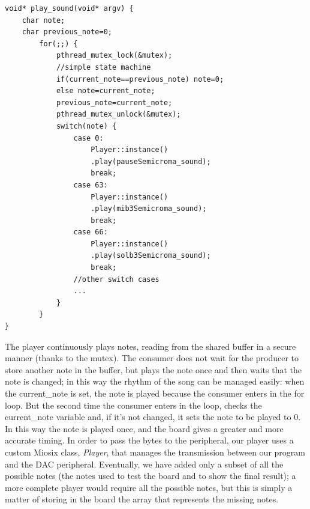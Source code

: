 \documentclass[12pt]{article}
\begin{document}
\begin{lstlisting}
void* play_sound(void* argv) {
	char note;
	char previous_note=0;
		for(;;) {
			pthread_mutex_lock(&mutex);
			//simple state machine
			if(current_note==previous_note) note=0;
			else note=current_note;
			previous_note=current_note;
			pthread_mutex_unlock(&mutex);
			switch(note) {
				case 0:
					Player::instance()
					.play(pauseSemicroma_sound);
					break;
				case 63:
					Player::instance()
					.play(mib3Semicroma_sound);
					break;
				case 66:
					Player::instance()
					.play(solb3Semicroma_sound);
					break;
				//other switch cases
				...
			}
		}
}
\end{lstlisting}
The player continuously plays notes, reading from the shared buffer in a secure manner (thanks to the mutex). The consumer does not wait for the producer to store another note in the buffer, but plays the note once and then waits that the note is changed; in this way the rhythm of the song can be managed easily: when the current\_note is set, the note is played because the consumer enters in the for loop. But the second time the consumer enters in the loop, checks the current\_note variable and, if it's not changed, it sets the note to be played to 0. In this way the note is played once, and the board gives a greater and more accurate timing.\newline
In order to pass the bytes to the peripheral, our player uses a custom Miosix class, \textit{Player}, that manages the transmission between our program and the DAC peripheral. Eventually, we have added only a subset of all the possible notes (the notes used to test the board and to show the final result); a more complete player would require all the possible notes, but this is simply a matter of storing in the board the array that represents the missing notes.
\end{document}
